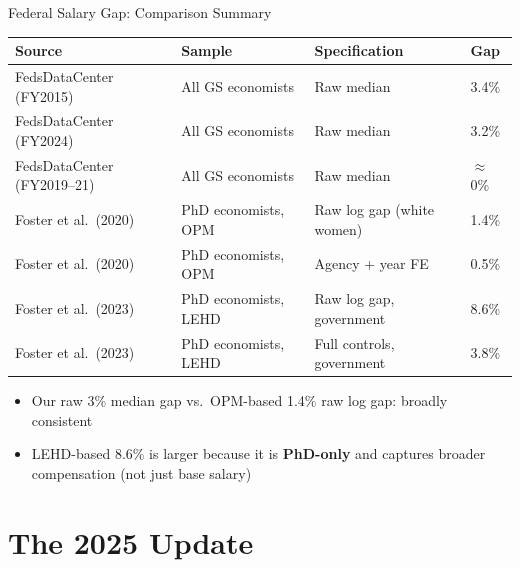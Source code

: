 \documentclass[aspectratio=169]{beamer}
\begin{document}
\begin{frame}{Federal Salary Gap: Comparison Summary}
  \begin{center}
    \small
    \begin{tabular}{llll}
      \toprule
      Source & Sample & Specification & Gap \\
      \midrule
      FedsDataCenter (FY2015)  & All GS economists & Raw median & 3.4\% \\
      FedsDataCenter (FY2024)  & All GS economists & Raw median & 3.2\% \\
      FedsDataCenter (FY2019--21) & All GS economists & Raw median & $\approx$0\% \\
      \midrule
      Foster et al.\ (2020) & PhD economists, OPM & Raw log gap (white women) & 1.4\% \\
      Foster et al.\ (2020) & PhD economists, OPM & Agency + year FE & 0.5\% \\
      \midrule
      Foster et al.\ (2023) & PhD economists, LEHD & Raw log gap, government & 8.6\% \\
      Foster et al.\ (2023) & PhD economists, LEHD & Full controls, government & 3.8\% \\
      \bottomrule
    \end{tabular}
  \end{center}
  \vspace{0.3em}
  \small
  \begin{itemize}
    \item Our raw 3\% median gap vs.\ OPM-based 1.4\% raw log gap: broadly consistent
    \item LEHD-based 8.6\% is larger because it is \textbf{PhD-only} and captures broader
          compensation (not just base salary)
  \end{itemize}
\end{frame}

\section{The 2025 Update}
\end{document}
